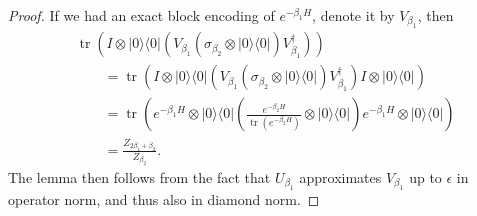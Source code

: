 \documentclass[10pt,a4paper]{amsart}
\newcommand{\ketbra}[2]{|#1\rangle\langle #2|}
\def\lb{\left(}
\def\rb{\right)}
\newcommand{\tr}[1]{\operatorname{tr}\lb#1\rb}
\begin{document}
\begin{proof}
	If we had an exact block encoding of $e^{-\beta_{1} H}$, denote it by $V_{\beta_{1}}$, then
	\begin{align}
		&\tr{I \otimes \ketbra{0}{0}\left(V_{\beta_1}(\sigma_{\beta_2}\otimes\ketbra{0}{0})V_{\beta_1}^\dagger\right)}\\
		&\qquad =\tr{I \otimes \ketbra{0}{0}\left(V_{\beta_1}(\sigma_{\beta_2}\otimes\ketbra{0}{0})V_{\beta_1}^\dagger\right) I \otimes \ketbra{0}{0}}\\
		&\qquad =\tr{e^{-\beta_1 H}\otimes \ketbra{0}{0}\left(\frac{e^{-\beta_2H}}{\tr{e^{-\beta_2 H}}}\otimes \ketbra{0}{0}\right)e^{-\beta_1 H}\otimes \ketbra{0}{0}}\\
		&\qquad =\frac{Z_{2\beta_{1}+\beta_{2}}}{Z_{\beta_{2}}}.
	\end{align}
	The lemma then follows from the fact that $U_{\beta_1}$ approximates $V_{\beta_1}$ up to $\epsilon$ in operator norm, and thus also in diamond norm.
\end{proof}
\end{document}
